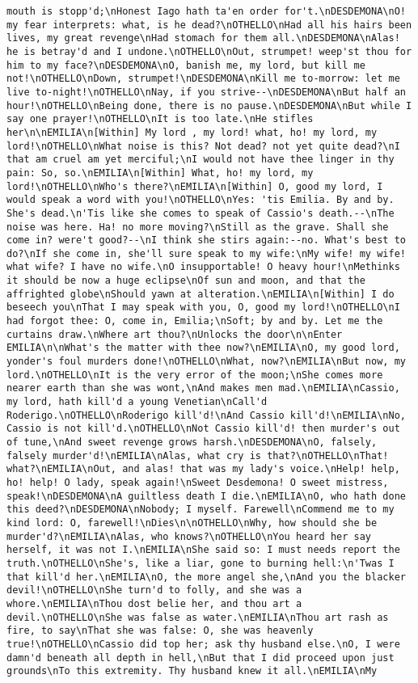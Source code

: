 \begin{verbatim}
mouth is stopp'd;\nHonest Iago hath ta'en order for't.\nDESDEMONA\nO! my fear interprets: what, is he dead?\nOTHELLO\nHad all his hairs been lives, my great revenge\nHad stomach for them all.\nDESDEMONA\nAlas! he is betray'd and I undone.\nOTHELLO\nOut, strumpet! weep'st thou for him to my face?\nDESDEMONA\nO, banish me, my lord, but kill me not!\nOTHELLO\nDown, strumpet!\nDESDEMONA\nKill me to-morrow: let me live to-night!\nOTHELLO\nNay, if you strive--\nDESDEMONA\nBut half an hour!\nOTHELLO\nBeing done, there is no pause.\nDESDEMONA\nBut while I say one prayer!\nOTHELLO\nIt is too late.\nHe stifles her\n\nEMILIA\n[Within] My lord , my lord! what, ho! my lord, my lord!\nOTHELLO\nWhat noise is this? Not dead? not yet quite dead?\nI that am cruel am yet merciful;\nI would not have thee linger in thy pain: So, so.\nEMILIA\n[Within] What, ho! my lord, my lord!\nOTHELLO\nWho's there?\nEMILIA\n[Within] O, good my lord, I would speak a word with you!\nOTHELLO\nYes: 'tis Emilia. By and by. She's dead.\n'Tis like she comes to speak of Cassio's death.--\nThe noise was here. Ha! no more moving?\nStill as the grave. Shall she come in? were't good?--\nI think she stirs again:--no. What's best to do?\nIf she come in, she'll sure speak to my wife:\nMy wife! my wife! what wife? I have no wife.\nO insupportable! O heavy hour!\nMethinks it should be now a huge eclipse\nOf sun and moon, and that the affrighted globe\nShould yawn at alteration.\nEMILIA\n[Within] I do beseech you\nThat I may speak with you, O, good my lord!\nOTHELLO\nI had forgot thee: O, come in, Emilia;\nSoft; by and by. Let me the curtains draw.\nWhere art thou?\nUnlocks the door\n\nEnter EMILIA\n\nWhat's the matter with thee now?\nEMILIA\nO, my good lord, yonder's foul murders done!\nOTHELLO\nWhat, now?\nEMILIA\nBut now, my lord.\nOTHELLO\nIt is the very error of the moon;\nShe comes more nearer earth than she was wont,\nAnd makes men mad.\nEMILIA\nCassio, my lord, hath kill'd a young Venetian\nCall'd Roderigo.\nOTHELLO\nRoderigo kill'd!\nAnd Cassio kill'd!\nEMILIA\nNo, Cassio is not kill'd.\nOTHELLO\nNot Cassio kill'd! then murder's out of tune,\nAnd sweet revenge grows harsh.\nDESDEMONA\nO, falsely, falsely murder'd!\nEMILIA\nAlas, what cry is that?\nOTHELLO\nThat! what?\nEMILIA\nOut, and alas! that was my lady's voice.\nHelp! help, ho! help! O lady, speak again!\nSweet Desdemona! O sweet mistress, speak!\nDESDEMONA\nA guiltless death I die.\nEMILIA\nO, who hath done this deed?\nDESDEMONA\nNobody; I myself. Farewell\nCommend me to my kind lord: O, farewell!\nDies\n\nOTHELLO\nWhy, how should she be murder'd?\nEMILIA\nAlas, who knows?\nOTHELLO\nYou heard her say herself, it was not I.\nEMILIA\nShe said so: I must needs report the truth.\nOTHELLO\nShe's, like a liar, gone to burning hell:\n'Twas I that kill'd her.\nEMILIA\nO, the more angel she,\nAnd you the blacker devil!\nOTHELLO\nShe turn'd to folly, and she was a whore.\nEMILIA\nThou dost belie her, and thou art a devil.\nOTHELLO\nShe was false as water.\nEMILIA\nThou art rash as fire, to say\nThat she was false: O, she was heavenly true!\nOTHELLO\nCassio did top her; ask thy husband else.\nO, I were damn'd beneath all depth in hell,\nBut that I did proceed upon just grounds\nTo this extremity. Thy husband knew it all.\nEMILIA\nMy 
\end{verbatim}
